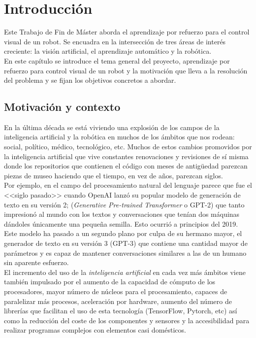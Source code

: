 \chapter{Introducción}\label{introduccion}

Este Trabajo de Fin de Máster aborda el aprendizaje por refuerzo para el control visual de un robot. Se encuadra en la intersección de tres áreas de interés creciente: la visión artificial, el aprendizaje automático y la robótica.\\

En este capítulo se introduce el tema general del proyecto, aprendizaje por refuerzo para control visual de un robot y la motivación que lleva a la resolución del problema y se fijan los objetivos concretos a abordar.

\section{Motivación y contexto}\label{motivacion}


En la última década se está viviendo una explosión de los campos de la inteligencia artificial y la robótica en muchos de los ámbitos que nos rodean: social, político, médico, tecnológico, etc. Muchos de estos cambios promovidos por la inteligencia artificial que vive constantes renovaciones y revisiones de sí misma donde los repositorios que contienen el código con meses de antigüedad parezcan piezas de museo haciendo que el tiempo, en vez de años, parezcan siglos.\\

Por ejemplo, en el campo del procesamiento natural del lenguaje parece que fue el <<siglo pasado>> cuando OpenAI lanzó su popular modelo de generación de texto en su versión 2; (\textit{Generative Pre-trained Transformer} o GPT-2) que tanto impresionó al mundo con los textos y conversaciones que tenían dos máquinas dándoles únicamente una pequeña semilla. Esto ocurrió a principios del 2019. Este modelo ha pasado a un segundo plano por culpa de su hermano mayor, el generador de texto en su versión 3 (GPT-3) que contiene una cantidad mayor de parámetros y es capaz de mantener conversaciones similares a las de un humano sin aparente esfuerzo.\\

El incremento del uso de la \textit{inteligencia artificial} en cada vez más ámbitos viene también impulsado por el aumento de la capacidad de cómputo de los procesadores, mayor número de núcleos para el procesamiento, capaces de paralelizar más procesos, aceleración por hardware, aumento del número de librerías que facilitan el uso de esta tecnología (TensorFlow, Pytorch, etc) así como la reducción del coste de los componentes y sensores y la accesibilidad para realizar programas complejos con elementos casi domésticos.\\

